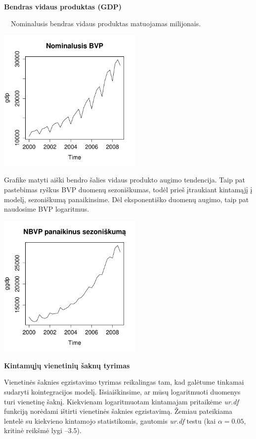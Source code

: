 \documentclass[12pt,a4paper]{article}
\theoremstyle{change}\newtheorem{salyga}{Uždavinys}
\begin{document}
\begin{flushleft}
\textbf{\Large {Bendras vidaus produktas (GDP)}}
\end{flushleft}
\vskip 15pt
$\quad$Nominalusis bendras vidaus produktas matuojamas milijonais. 
\\
\begin{center}
\includegraphics[width=70mm,height=70mm]{ngdp}
\end{center}
Grafike matyti aiški bendro šalies vidaus produkto augimo tendencija. Taip pat pastebimas ryškus BVP  duomenų sezoniškumas, todėl prieš įtraukiant kintamąjį į modelį, sezoniškumą panaikinsime. Dėl eksponentiško duomenų augimo, taip pat naudosime BVP logaritmus. 
\\
\begin{center}
\includegraphics[width=70mm,height=70mm]{gngdp}
\end{center}

\begin{flushleft}
\textbf{\Large {Kintamųjų vienetinių šaknų tyrimas}}
\end{flushleft}
\vskip 15pt

Vienetinės šaknies egzistavimo tyrimas reikalingas tam, kad galėtume tinkamai sudaryti kointegracijos modelį. Išsiaiškinsime, ar mūsų logaritmuoti duomenys turi vienetinę šaknį. Kiekvienam logaritmuotam kintamajam pritaikėme \textit{ur.df} funkciją norėdami ištirti vienetinės šaknies egzistavimą. Žemiau pateikiama lentelė su kiekvieno kintamojo statistikomis, gautomis \textit{ur.df} testu (kai $\alpha =0.05 $, kritinė reikšmė lygi –3.5).
\end{document}
